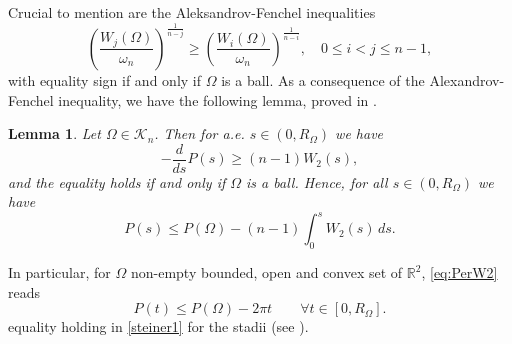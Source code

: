 \documentclass[oneside,a4paper,11pt,notitlepage]{article}
\theoremstyle{definition}
\theoremstyle{plain}
\newtheorem{lemma}[teorema]{Lemma}
\theoremstyle{definition}
\begin{document}
Crucial to mention are the Aleksandrov-Fenchel inequalities 
\begin{equation*}
\left( \frac{W_j(\Omega)}{\omega_n} \right)^{\frac{1}{n-j}} \ge \left(
  \frac{W_i(\Omega)}{\omega_n} \right)^{\frac{1}{n-i}}, \quad 0\le i < j
\le n-1,
\end{equation*}
with equality sign if and only if  $\Omega$ is
a ball. As a consequence of the Alexandrov-Fenchel inequality, we have the following lemma, proved in \cite{BNT2010}.
\begin{lemma}
\label{lema22}
Let $\Omega\in \mathcal{K}_n$. Then for a.e. $s\in (0,R_\Omega)$ we have
    \begin{equation*}
        -\frac{d}{ds}P(s) \ge (n-1) W_2(s),
    \end{equation*}
and the equality holds if and only if $\Omega$ is a ball.
Hence, for all $s\in (0,R_\Omega)$ we have  \begin{equation}\label{eq:PerW2}
       P(s) \le P(\Omega)-(n-1)\int_0^s W_2(s)\,ds.
    \end{equation}
\end{lemma}
 In particular, for $\Omega$ non-empty bounded, open and convex set of $\mathbb{R}^2$, \eqref{eq:PerW2} reads
  \begin{equation}\label{steiner1}
     P(t)\leq P(\Omega)-2\pi t \qquad \forall t \in [0,R_\Omega].
 \end{equation}
 equality holding in \eqref{steiner1} for the stadii (see \cite{fragala_gazzola_lamboley}).
 
\end{document}
